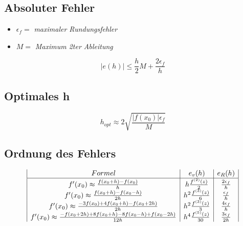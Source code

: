 \subsection{Absoluter Fehler}
\begin{itemize}
	\item $\epsilon_f = $ \textit{maximaler Rundungsfehler} \\
	\item $M = $ \textit{Maximum 2ter Ableitung} \\
\end{itemize}

\begin{equation*}
	|e(h)| \leq \frac{h}{2} M + \frac{2\epsilon_f}{h}
\end{equation*}

\subsection{Optimales h}
\begin{equation*}
	h_{opt} \approx 2 \sqrt{\frac{|f(x_0)| \epsilon_f}{M}}
\end{equation*}

\subsection{Ordnung des Fehlers}
\begin{displaymath}
	\begin{array}{| c | c | c |}
		Formel & e_v(h) & e_R(h) \\
		\hline
		f'(x_0) \approx \frac{f(x_0 + h) - f(x_0)}{h} & h \frac{f^{(2)}(z)}{2} & \frac{2\epsilon_f}{h} \\
		f'(x_0) \approx \frac{f(x_0 + h) - f(x_0 - h)}{2h} & h^2 \frac{f^{(3)}(z)}{6} & \frac{\epsilon_f}{h} \\
		f'(x_0) \approx \frac{-3f(x_0) + 4f(x_0 + h) - f(x_0 + 2h)}{2h} & h^2 \frac{f^{(3)}(z)}{3} & \frac{4\epsilon_f}{h} \\
		f'(x_0) \approx \frac{-f(x_0 + 2h) + 8f(x_0+h) -8f(x_0-h) + f(x_0-2h)}{12h} & h^4 \frac{f^{(5)}(z)}{30} & \frac{3\epsilon_f}{2h} \\
	\end{array}
\end{displaymath}